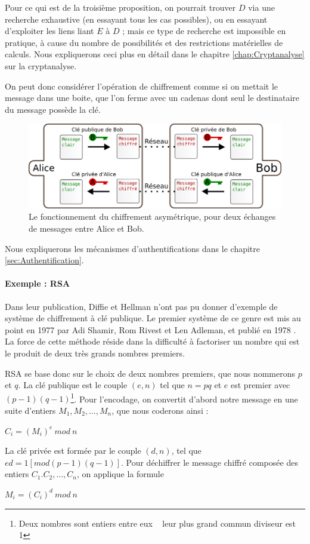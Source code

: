 Pour ce qui est de la troisième proposition, on pourrait trouver $D$
via une recherche exhaustive (en essayant tous les cas possibles), ou
en essayant d'exploiter les liens liant $E$ à $D$ ; mais ce type
de recherche est impossible en pratique, à cause du nombre de
possibilités et des restrictions matérielles de calculs. Nous
expliquerons ceci plus en détail dans le chapitre
\ref{chap:Cryptanalyse} sur la cryptanalyse.

On peut donc considérer l'opération de chiffrement comme si on
mettait le message dans une boite, que l'on ferme avec un cadenas
dont seul le destinataire du message possède la clé.

\begin{figure}[h]
  \begin{center}
    \includegraphics[scale=0.5]{images/ChiffrementAsymetrique.png}
  \end{center}
  \caption{Le fonctionnement du chiffrement asymétrique, pour deux
    échanges de messages entre Alice et Bob.}
  \label{fig:ChiffrementSymetrique}
\end{figure}

Nous expliquerons les mécanismes d'authentifications dans le 
chapitre \ref{sec:Authentification}. \\

\paragraph{Exemple : RSA}
Dans leur publication, Diffie et Hellman n'ont pas pu donner
d'exemple de système de chiffrement à clé publique. Le premier
système de ce genre est mis au point en 1977 par Adi Shamir, Rom
Rivest et Len Adleman, et publié en 1978 \cite{RSAPaper}.
La force de cette méthode réside dans la difficulté à factoriser
un nombre qui est le produit de deux très grands nombres premiers. 

RSA se base donc sur le choix de deux nombres premiers, que nous
nommerons $p$ et $q$.
La clé publique est le couple $(e,n)$ tel que $n = p q$ et $e$ est
premier avec $(p-1) (q-1)$\footnote{Deux nombres sont entiers
entre eux \ssi~ leur plus grand commun diviseur est 1}.
Pour l'encodage, on convertit d'abord notre message en une suite
d'entiers $M_1, M_2, \dots, M_n$, %
que nous coderons ainsi :
\begin{center}
  $C_i = (M_i)^e ~mod~n$
\end{center}

La clé privée est formée par le couple $(d,n)$, tel que
$e d = 1 [mod (p-1) (q-1)]$.
Pour déchiffrer le message chiffré composée des entiers $C_1. C_2,
\dots, C_n$, on applique la formule
\begin{center}
  $M_i = (C_i)^d ~mod~n$
\end{center}


